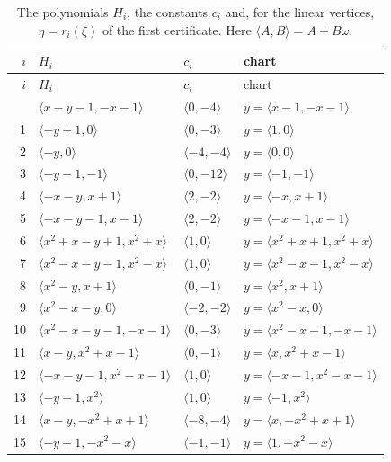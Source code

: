 \documentclass[11pt]{article}
\begin{document}
\clearpage
\begingroup\small
\setlength{\LTcapwidth}{\textwidth}
\begin{longtable}{@{}rlll@{}}
\caption{The polynomials $H_i$, the constants $c_i$ and, for the linear vertices, $\eta=r_i(\xi)$ of the first certificate. Here $\langle A,B\rangle=A+B\omega$.}\label{tab:vert1}\\
\hline $i$ & $H_i$ & $c_i$ & chart\\\hline\endfirsthead\hline $i$ & $H_i$ & $c_i$ & chart\\\hline\endhead\hline\endfoot
0 & $\langle x-y-1,-x-1\rangle$ & $\langle 0,-4\rangle$ & $y=\langle x-1,-x-1\rangle$\\
1 & $\langle -y+1,0\rangle$ & $\langle 0,-3\rangle$ & $y=\langle 1,0\rangle$\\
2 & $\langle -y,0\rangle$ & $\langle -4,-4\rangle$ & $y=\langle 0,0\rangle$\\
3 & $\langle -y-1,-1\rangle$ & $\langle 0,-12\rangle$ & $y=\langle -1,-1\rangle$\\
4 & $\langle -x-y,x+1\rangle$ & $\langle 2,-2\rangle$ & $y=\langle -x,x+1\rangle$\\
5 & $\langle -x-y-1,x-1\rangle$ & $\langle 2,-2\rangle$ & $y=\langle -x-1,x-1\rangle$\\
6 & $\langle x^{2}+x-y+1,x^{2}+x\rangle$ & $\langle 1,0\rangle$ & $y=\langle x^{2}+x+1,x^{2}+x\rangle$\\
7 & $\langle x^{2}-x-y-1,x^{2}-x\rangle$ & $\langle 1,0\rangle$ & $y=\langle x^{2}-x-1,x^{2}-x\rangle$\\
8 & $\langle x^{2}-y,x+1\rangle$ & $\langle 0,-1\rangle$ & $y=\langle x^{2},x+1\rangle$\\
9 & $\langle x^{2}-x-y,0\rangle$ & $\langle -2,-2\rangle$ & $y=\langle x^{2}-x,0\rangle$\\
10 & $\langle x^{2}-x-y-1,-x-1\rangle$ & $\langle 0,-3\rangle$ & $y=\langle x^{2}-x-1,-x-1\rangle$\\
11 & $\langle x-y,x^{2}+x-1\rangle$ & $\langle 0,-1\rangle$ & $y=\langle x,x^{2}+x-1\rangle$\\
12 & $\langle -x-y-1,x^{2}-x-1\rangle$ & $\langle 1,0\rangle$ & $y=\langle -x-1,x^{2}-x-1\rangle$\\
13 & $\langle -y-1,x^{2}\rangle$ & $\langle 1,0\rangle$ & $y=\langle -1,x^{2}\rangle$\\
14 & $\langle x-y,-x^{2}+x+1\rangle$ & $\langle -8,-4\rangle$ & $y=\langle x,-x^{2}+x+1\rangle$\\
15 & $\langle -y+1,-x^{2}-x\rangle$ & $\langle -1,-1\rangle$ & $y=\langle 1,-x^{2}-x\rangle$\\

\end{longtable}
\end{document}
